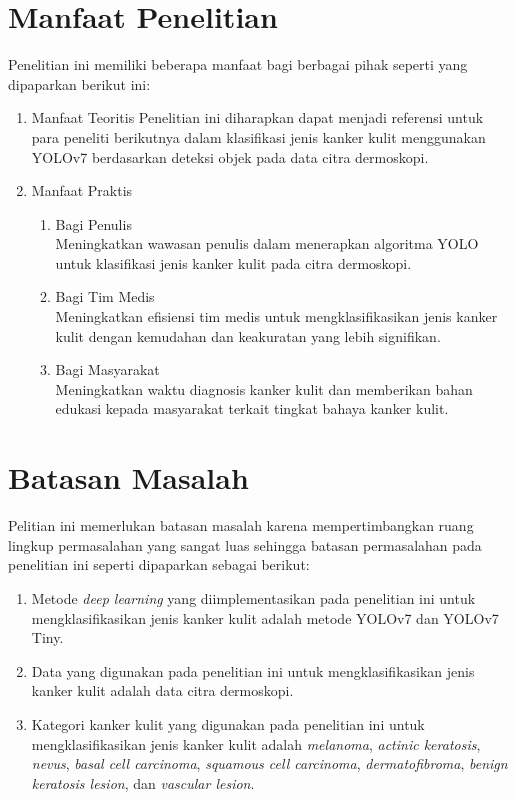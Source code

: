    \section{Manfaat Penelitian}
    Penelitian ini memiliki beberapa manfaat bagi berbagai pihak seperti yang dipaparkan berikut ini:
    \begin{enumerate}
        \item Manfaat Teoritis
        Penelitian ini diharapkan dapat menjadi referensi untuk para peneliti berikutnya dalam klasifikasi jenis kanker kulit menggunakan YOLOv7 berdasarkan deteksi objek pada data citra dermoskopi.

        \item Manfaat Praktis
        \begin{enumerate}
            \item Bagi Penulis\\
            Meningkatkan wawasan penulis dalam menerapkan algoritma YOLO untuk klasifikasi jenis kanker kulit pada citra dermoskopi.

            \item Bagi Tim Medis\\
            Meningkatkan efisiensi tim medis untuk mengklasifikasikan jenis kanker kulit dengan kemudahan dan keakuratan yang lebih signifikan.

            \item Bagi Masyarakat\\
            Meningkatkan waktu diagnosis kanker kulit dan memberikan bahan edukasi kepada masyarakat terkait tingkat bahaya kanker kulit.
        \end{enumerate}
    \end{enumerate}

    \section{Batasan Masalah}
    Pelitian ini memerlukan batasan masalah karena mempertimbangkan ruang lingkup permasalahan yang sangat luas sehingga batasan permasalahan pada penelitian ini seperti dipaparkan sebagai berikut:
    \begin{enumerate}
        \item Metode \textit{deep learning} yang diimplementasikan pada penelitian ini untuk mengklasifikasikan jenis kanker kulit adalah metode YOLOv7 dan YOLOv7 Tiny.
        \item Data yang digunakan pada penelitian ini untuk mengklasifikasikan jenis kanker kulit adalah data citra dermoskopi.
        \item Kategori kanker kulit yang digunakan pada penelitian ini untuk mengklasifikasikan jenis kanker kulit adalah \textit{melanoma}, \textit{actinic keratosis}, \textit{nevus}, \textit{basal cell carcinoma}, \textit{squamous cell carcinoma}, \textit{dermatofibroma}, \textit{benign keratosis lesion}, dan \textit{vascular lesion}.
    \end{enumerate}

